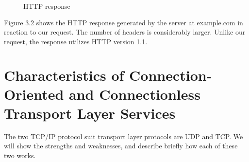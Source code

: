 \documentclass[10pt]{report}
\begin{document}
\begin{figure}[p]
    \label{httpresponse}
    \centering
    \setlength\fboxsep{0pt}
    \setlength\fboxrule{0.5pt}
    \caption{HTTP response}
\end{figure}

Figure
%
3.2
%
shows the HTTP response generated by the server at
example.com in reaction to our request.  The number of headers is
considerably larger.  Unlike our request, the response utilizes HTTP
version 1.1.


\chapter{Characteristics of Connection-Oriented and Connectionless Transport
	Layer Services}
\thispagestyle{fancy}

The two TCP/IP protocol suit transport layer protocols are UDP and TCP.
We will show the strengths and weaknesses, and describe briefly how
each of these two works.
\end{document}
